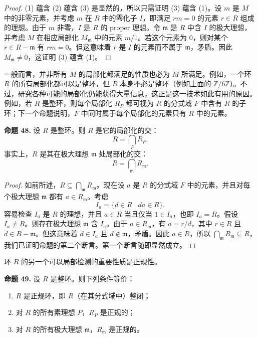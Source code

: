 \begin{proof}
	(1) 蕴含 (2) 蕴含 (3) 是显然的，所以只需证明 (3) 蕴含 (1)。设 $m$ 是 $M$ 中的非零元素，并考虑 $m$ 在 $R$ 中的零化子 $I$，即满足 $rm=0$ 的元素 $r\in R$ 组成的理想。由于 $m$ 非零，$I$ 是 $R$ 的 proper 理想。令 $\mathfrak m$ 是 $R$ 中含 $I$ 的极大理想，并考虑 $M$ 在相应局部化 $M_{\mathfrak m}$ 中的元素 $m/1$。若这个元素为 $0$，则对某个 $r\in R-\mathfrak m$ 有 $rm=0$。但这意味着 $r$ 是 $I$ 的元素而不属于 $\mathfrak m$，矛盾。因此 $M_{\mathfrak m}\ne0$，这证明 (3) 蕴含 (1)。
\end{proof}

一般而言，并非所有 $M$ 的局部化都满足的性质也必为 $M$ 所满足。例如，一个环 $R$ 的所有局部化都可以是整环，但 $R$ 本身不必是整环（例如上面的 $\mathbb Z/6\mathbb Z$）。不过，研究各种可能的局部化仍能获得大量信息，这正是这一技术如此有用的原因。例如，若 $R$ 是整环，则每个局部化 $R_P$ 都可视为 $R$ 的分式域 $F$ 中含有 $R$ 的子环；下一个命题说明，$F$ 中同时属于每个局部化的元素只有 $R$ 中的元素。

\noindent\textbf{命题 48.} 设 $R$ 是整环。则 $R$ 是它的局部化的交：
\[
R=\bigcap_P R_P.
\]
事实上，$R$ 是其在极大理想 $\mathfrak m$ 处局部化的交：
\[
R=\bigcap_{\mathfrak m} R_{\mathfrak m}.
\]

\begin{proof}
	如前所述，$R\subseteq\bigcap_{\mathfrak m}R_{\mathfrak m}$。现在设 $a$ 是 $R$ 的分式域 $F$ 中的元素，并且对每个极大理想 $\mathfrak m$ 都有 $a\in R_{\mathfrak m}$。考虑
	\[
	I_a=\{d\in R\mid da\in R\}.
	\]
	容易检查 $I_a$ 是 $R$ 的理想，并且 $a\in R$ 当且仅当 $1\in I_a$，也即 $I_a=R$。假设 $I_a\ne R$。则存在极大理想 $\mathfrak m$ 含 $I_a$。由于 $a\in R_{\mathfrak m}$，有 $a=r/d$，其中 $r\in R$ 且 $d\in R-\mathfrak m$。但这意味着 $d\in I_a$ 且 $d\notin\mathfrak m$，矛盾。因此 $a\in R$，所以 $\bigcap_{\mathfrak m}R_{\mathfrak m}\subseteq R$，我们已证明命题的第二个断言。第一个断言随即显然成立。
\end{proof}

环 $R$ 的另一个可以局部检测的重要性质是正规性。

\noindent\textbf{命题 49.} 设 $R$ 是整环。则下列条件等价：
\begin{enumerate}[label=(\arabic*)]
	\item $R$ 是正规环，即 $R$（在其分式域中）整闭；
	\item 对 $R$ 的所有素理想 $P$，$R_P$ 是正规的；
	\item 对 $R$ 的所有极大理想 $\mathfrak m$，$R_{\mathfrak m}$ 是正规的。
\end{enumerate}

